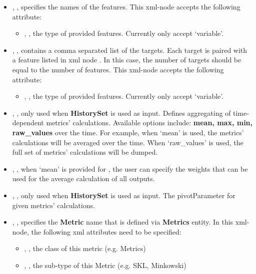 \begin{itemize}
  \item {}, , specifies the names of the features.
    This xml-node accepts the following attribute:
    \begin{itemize}
      \item {}, , the type of provided features. Currently only
        accept `variable'.
    \end{itemize}
  \item {}, , contains a comma separated list of
    the targets. \nb Each target is paired with a feature listed in xml node . In this case, the
    number of targets should be equal to the number of features.
    This xml-node accepts the following attribute:
    \begin{itemize}
      \item {}, , the type of provided features. Currently only
        accept `variable'.
    \end{itemize}
  \item {}, , only used when \textbf{HistorySet} is used as
    input. Defines aggregating of time-dependent metrics' calculations. Available options include:
    \textbf{mean, max, min, raw\_values} over the time. For example, when `mean' is used, the metrics' calculations
    will be averaged over the time. When `raw\_values' is used, the full set of  metrics' calculations will be dumped.
  \item {}, , when `mean' is provided for ,
    the user can specify the weights that can be used for the average calculation of all outputs.
  \item {}, , only used when \textbf{HistorySet}
    is used as input. The pivotParameter for given metrics' calculations.
  \item {}, , specifies the \textbf{Metric} name that is defined via
    \textbf{Metrics} entity. In this xml-node, the following xml attributes need to be specified:
    \begin{itemize}
      \item {}, , the class of this metric (e.g. Metrics)
      \item {}, , the sub-type of this Metric (e.g. SKL, Minkowski)
    \end{itemize}
\end{itemize}

